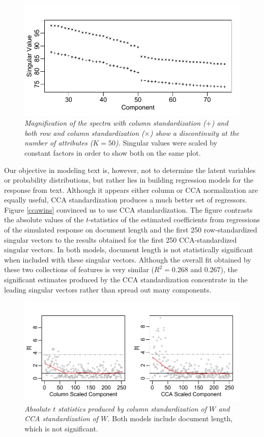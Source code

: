 \documentclass[12pt]{article}
\begin{document}
\begin{figure}
\caption{ \label{fig:gap} 
{ \sl Magnification of the spectra with column standardization ($+$) and both row and column standardization ($\times$) show a discontinuity at the number of attributes ($K=50$).}  Singular values were scaled by constant factors in order to show both on the same plot.}
 \centerline{
 \vspace{0.1in}
 \includegraphics[width=6.0in]{figures/gap} }
 \end{figure}

Our objective in modeling text is, however, not to determine the latent variables or probability distributions, but rather lies in building regression models for the response from text.  Although it  appears either column or CCA normalization are equally useful, CCA  standardization produces a much better set of regressors.  Figure \ref{ccawins} convinced us to use CCA standardization.  The figure contrasts the absolute values of the $t$-statistics of the estimated coefficients from regressions of the simulated response on document length and  the first 250 row-standardized singular vectors to the results obtained for the first 250 CCA-standardized singular vectors. In both models, document length is not statistically significant when included with these singular vectors.  Although the overall fit obtained by these two collections of features is very similar ($R^2 = 0.268$ and $0.267$), the significant estimates produced by the CCA standardization concentrate in the leading singular vectors rather than spread out many components.  


\begin{figure}
\caption{ \label{fig:ccawins} 
{ \sl Absolute $t$ statistics produced by column standardization of $W$ and CCA standardization of $W$.}
  Both models include document length, which is not significant.}
 \centerline{
 \vspace{0.1in}
 \includegraphics[width=6.0in]{figures/ccawins} }
 \end{figure}
\end{document}
